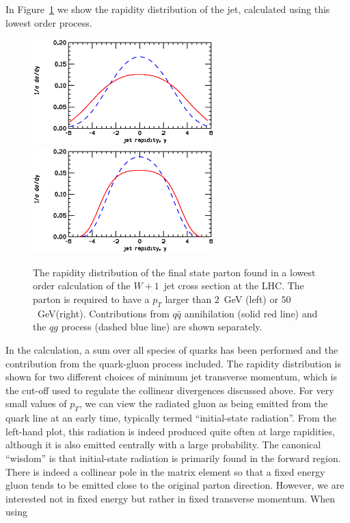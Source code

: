 \documentclass[12pt]{iopart}
\begin{document}
In Figure~\ref{fig:raps} we show the rapidity distribution of the jet, calculated using
this lowest order process.
%
\begin{figure}[t]
\begin{center}
\includegraphics[width=7cm]{raps2.ps}
\includegraphics[width=7cm]{raps50.ps}
\end{center}
\caption{The rapidity distribution of the final state parton found in a lowest order calculation
of the $W+1$~jet cross section at the LHC. The parton is required to have
a $p_T$ larger than $2$~GeV (left) or $50$~GeV(right). Contributions from $q{\bar q}$ annihilation (solid red
line) and the $qg$ process (dashed blue line) are shown separately.}
\label{fig:raps}
\end{figure}
%
In the calculation, a sum over all species of quarks has been performed and the contribution from
the quark-gluon process included. The rapidity distribution is shown for two different choices of
minimum jet transverse momentum, which is the cut-off used to regulate the collinear divergences
discussed above. For very small values of $p_T$, we can view the radiated gluon as being emitted
from the quark line at an early time, typically termed ``initial-state radiation''. From the
left-hand plot, this radiation is indeed produced quite often at large rapidities, although it is
also emitted centrally with a large probability. The canonical ``wisdom'' is that initial-state
radiation is primarily found in the forward region. There is indeed a collinear pole in the matrix
element so that a fixed energy gluon tends to be emitted close to the original parton direction.
However, we are interested not in fixed energy but rather in fixed transverse momentum. When using
\end{document}
